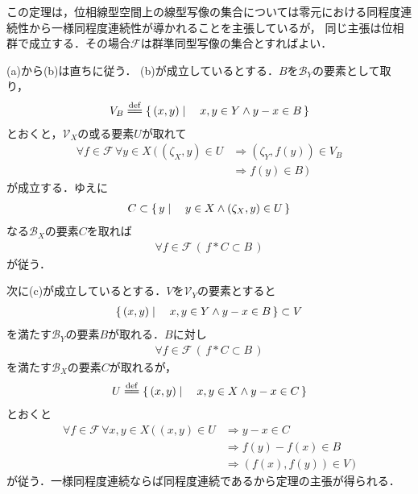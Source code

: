 	この定理は，位相線型空間上の線型写像の集合については零元における同程度連続性から一様同程度連続性が導かれることを主張しているが，
	同じ主張は位相群で成立する．その場合$\mathscr{F}$は群準同型写像の集合とすればよい．
	
	\begin{sketch}
		(a)から(b)は直ちに従う．
		(b)が成立しているとする．$B$を$\mathscr{B}_Y$の要素として取り，
		\begin{align}
			V_B \defeq \Set{(x,y)}{x,y \in Y \wedge y - x \in B}
		\end{align}
		とおくと，$\mathscr{V}_X$の或る要素$U$が取れて
		\begin{align}
			\forall f \in \mathscr{F}\, \forall y \in X\, (\, (\zeta_X,y) \in U
			&\Longrightarrow (\zeta_Y,f(y)) \in V_B \\
			&\Longrightarrow f(y) \in B\, )
		\end{align}
		が成立する．ゆえに
		\begin{align}
			C \subset \left\{\, y \mid \quad y \in X \wedge (\zeta_X,y) \in U\, \right\}
		\end{align}
		なる$\mathscr{B}_X$の要素$C$を取れば
		\begin{align}
			\forall f \in \mathscr{F}\, \left(\, f \ast C \subset B\, \right)
		\end{align}
		が従う．
		
		次に(c)が成立しているとする．$V$を$\mathscr{V}_Y$の要素とすると
		\begin{align}
			\left\{\, (x,y) \mid \quad x,y \in Y \wedge y - x \in B\, \right\} \subset V
		\end{align}
		を満たす$\mathscr{B}_Y$の要素$B$が取れる．$B$に対し
		\begin{align}
			\forall f \in \mathscr{F}\, \left(\, f \ast C \subset B\, \right)
		\end{align}
		を満たす$\mathscr{B}_X$の要素$C$が取れるが，
		\begin{align}
			U \defeq \Set{(x,y)}{x,y \in X \wedge y - x \in C}
		\end{align}
		とおくと
		\begin{align}
			\forall f \in \mathscr{F}\, \forall x,y \in X\, (\, (x,y) \in U 
			&\Longrightarrow y - x \in C \\
			&\Longrightarrow f(y) - f(x) \in B \\
			&\Longrightarrow (f(x),f(y)) \in V\, )
		\end{align}
		が従う．一様同程度連続ならば同程度連続であるから定理の主張が得られる．
		\QED
	\end{sketch}
	
